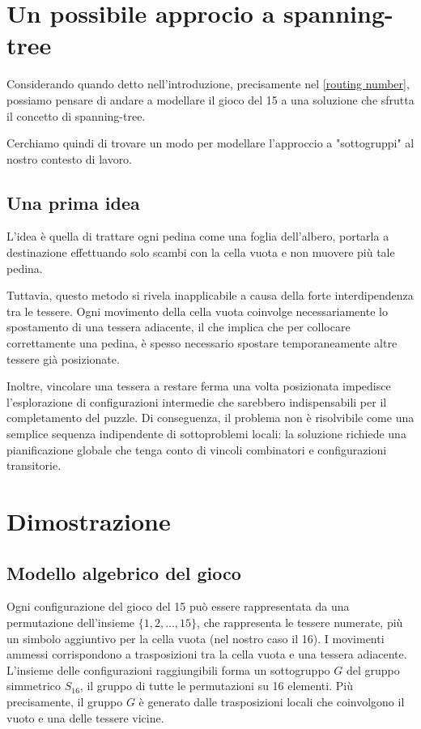 \section{Un possibile approcio a spanning-tree}
Considerando quando detto nell'introduzione, precisamente nel \cref{routing number}, possiamo pensare di andare a modellare il gioco del 15 a una soluzione che sfrutta il concetto di spanning-tree.

Cerchiamo quindi di trovare un modo per modellare l'approccio a "sottogruppi" al nostro contesto di lavoro. 

\subsection{Una prima idea}
L'idea è quella di trattare ogni pedina come una foglia dell'albero, portarla a destinazione effettuando solo scambi con la cella vuota e non muovere più tale pedina.

 Tuttavia, questo metodo si rivela inapplicabile a causa della forte interdipendenza tra le tessere. Ogni movimento della cella vuota coinvolge necessariamente lo spostamento di una tessera adiacente, il che implica che per collocare correttamente una pedina, è spesso necessario spostare temporaneamente altre tessere già posizionate.
 
 Inoltre, vincolare una tessera a restare ferma una volta posizionata impedisce l'esplorazione di configurazioni intermedie che sarebbero indispensabili per il completamento del puzzle. Di conseguenza, il problema non è risolvibile come una semplice sequenza indipendente di sottoproblemi locali: la soluzione richiede una pianificazione globale che tenga conto di vincoli combinatori e configurazioni transitorie.

\section{Dimostrazione}

\subsection{Modello algebrico del gioco}

Ogni configurazione del gioco del 15 può essere rappresentata da una permutazione dell'insieme $\{1, 2, \dots, 15\}$, che rappresenta le tessere numerate, più un simbolo aggiuntivo per la cella vuota (nel nostro caso il 16). I movimenti ammessi corrispondono a trasposizioni tra la cella vuota e una tessera adiacente. L'insieme delle configurazioni raggiungibili forma un sottogruppo $G$ del gruppo simmetrico $S_{16}$, il gruppo di tutte le permutazioni su 16 elementi. Più precisamente, il gruppo $G$ è generato dalle trasposizioni locali che coinvolgono il vuoto e una delle tessere vicine.

